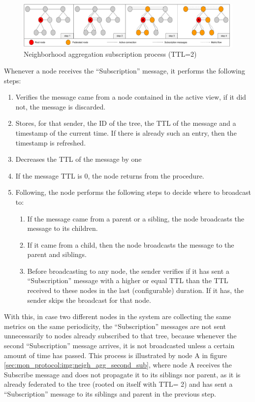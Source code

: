 \begin{figure}[htbp]
    \centering
    \includegraphics[width=\textwidth]{Chapters/aggregation/images/neigh-agg-subscribe.pdf}
    \caption{Neighborhood aggregation subscription process (TTL=2)}
    \label{sec:mon_protocol:img:neigh_agg_sub}
\end{figure}
     
Whenever a node receives the ``Subscription'' message, it performs the following steps:

\begin{enumerate} \label{sec:mon_protocol:enum:neigh_agg_sub_opts}
    \item Verifies the message came from a node contained in the active view, if it did not, the message is discarded.
    \item Stores, for that sender, the ID of the tree, the TTL of the message and a timestamp of the current time. If there is already such an entry, then the timestamp is refreshed.
    \item Decreases the TTL of the message by one
    \item If the message TTL is 0, the node returns from the procedure.
    \item Following, the node performs the following steps to decide where to broadcast to:
            \begin{enumerate}
                \item If the message came from a parent or a sibling, the node broadcasts the message to its children.
                \item If it came from a child, then the node broadcasts the message to the parent and siblings.
                \item Before broadcasting to any node, the sender verifies if it has sent a ``Subscription'' message with a higher or equal TTL than the TTL received to these nodes in the last (configurable) duration. If it has, the sender skips the broadcast for that node.
            \end{enumerate}
\end{enumerate}

With this, in case two different nodes in the system are collecting the same metrics on the same periodicity, the ``Subscription'' messages are not sent unnecessarily to nodes already subscribed to that tree, because whenever the second ``Subscription'' message arrives, it is not broadcasted unless a certain amount of time has passed. This process is illustrated by node A in figure \ref{sec:mon_protocol:img:neigh_agg_second_sub}, where node A receives the Subscribe message and does not propagate it to its siblings nor parent, as it is already federated to the tree (rooted on itself with TTL= 2) and has sent a ``Subscription'' message to its siblings and parent in the previous step.

